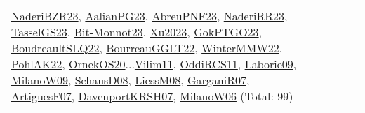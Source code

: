 {\begin{longtable}{p{3cm}r>{\raggedright\arraybackslash}p{6cm}>{\raggedright\arraybackslash}p{6cm}>{\raggedright\arraybackslash}p{8cm}}
\hyperref[detail:NaderiBZR23]{NaderiBZR23}, \hyperref[detail:AalianPG23]{AalianPG23}, \hyperref[detail:AbreuPNF23]{AbreuPNF23}, \hyperref[detail:NaderiRR23]{NaderiRR23}, \hyperref[detail:TasselGS23]{TasselGS23}, \hyperref[detail:Bit-Monnot23]{Bit-Monnot23}, \hyperref[detail:Xu2023]{Xu2023}, \hyperref[detail:GokPTGO23]{GokPTGO23}, \hyperref[detail:BoudreaultSLQ22]{BoudreaultSLQ22}, \hyperref[detail:BourreauGGLT22]{BourreauGGLT22}, \hyperref[detail:WinterMMW22]{WinterMMW22}, \hyperref[detail:PohlAK22]{PohlAK22}, \hyperref[detail:OrnekOS20]{OrnekOS20}...\hyperref[detail:Vilim11]{Vilim11}, \hyperref[detail:OddiRCS11]{OddiRCS11}, \hyperref[detail:Laborie09]{Laborie09}, \hyperref[detail:MilanoW09]{MilanoW09}, \hyperref[detail:SchausD08]{SchausD08}, \hyperref[detail:LiessM08]{LiessM08}, \hyperref[detail:GarganiR07]{GarganiR07}, \hyperref[detail:ArtiguesF07]{ArtiguesF07}, \hyperref[detail:DavenportKRSH07]{DavenportKRSH07}, \hyperref[detail:MilanoW06]{MilanoW06} (Total: 99)\\

\end{longtable}}
